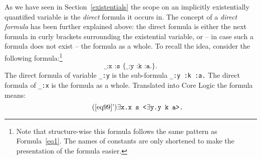 As we have seen in Section~\ref{existentials} the scope on an implicitly existentially quantified variable is the \emph{direct} formula it occurs in. 
The concept of a \emph{direct formula} has been further explained above: 
the direct formula is either the next formula in curly brackets surrounding the existential variable, or -- in case such a formula does not exist -- the formula as a whole.
To recall the idea, consider the following formula:\footnote{Note that structure-wise this formula follows the same pattern as Formula~\ref{eq1}. 
The names of constants are only shortened to
make the presentation of the formula easier.}
\begin{equation}
\texttt{\_:x :s \{\_:y :k :a.\}.} \label{eq99}
\end{equation}
The direct formula of variable \texttt{\_:y} is the sub-formula \texttt{\_:y :k :a.} The direct formula of \texttt{\_:x} is
the formula as a whole.
Translated into \nthree Core Logic the formula means:
\begin{equation}\tag{\ref{eq99}'}\label{eq99'}
 \exists \texttt{x.x s <}\exists \texttt{y.y k a>.}
\end{equation}


